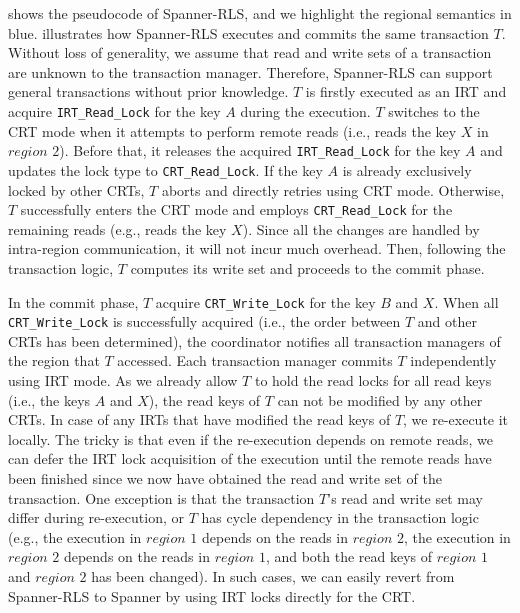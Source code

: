  shows the pseudocode of Spanner-RLS, and we highlight the regional semantics in blue.  illustrates how Spanner-RLS executes and commits the same transaction $T$. Without loss of generality, we assume that read and write sets of a transaction are unknown to the transaction manager. Therefore, Spanner-RLS can support general transactions without prior knowledge. $T$ is firstly executed as an IRT and acquire \texttt{IRT\_Read\_Lock} for the key $A$ during the execution. $T$ switches to the CRT mode when it attempts to perform remote reads (i.e., reads the key $X$ in $region$ $2$). Before that, it releases the acquired \texttt{IRT\_Read\_Lock} for the key $A$  and updates the lock type to \texttt{CRT\_Read\_Lock}. If the key $A$ is already exclusively locked by other CRTs, $T$ aborts and directly retries using CRT mode. Otherwise, $T$ successfully enters the CRT mode and employs \texttt{CRT\_Read\_Lock} for the remaining reads (e.g., reads the key $X$).
Since all the changes are handled by intra-region communication, it will not incur much overhead. Then, following the transaction logic, $T$ computes its write set and proceeds to the commit phase. 



In the commit phase, $T$ acquire \texttt{CRT\_Write\_Lock} for the key $B$ and $X$. When all \texttt{CRT\_Write\_Lock} is successfully acquired (i.e., the order between $T$ and other CRTs has been determined), the coordinator notifies all transaction managers of the region that $T$ accessed. Each transaction manager commits $T$ independently using IRT mode. As we already allow $T$ to hold the read locks for all read keys (i.e., the keys $A$ and $X$), the read keys of $T$ can not be modified by any other CRTs. In case of any IRTs that have modified the read keys of $T$, we re-execute it locally. The tricky is that even if the re-execution depends on remote reads, we can defer the IRT lock acquisition of the execution until the remote reads have been finished since we now have obtained the read and write set of the transaction. One exception is that the transaction $T$'s read and write set may differ during re-execution, or $T$ has cycle dependency in the transaction logic (e.g., the execution in $region$ $1$ depends on the reads in $region$ $2$, the execution in $region$ $2$ depends on the reads in $region$ $1$, and both the read keys of $region$ $1$ and $region$ $2$ has been changed). In such cases, we can easily revert from Spanner-RLS to Spanner by using IRT locks directly for the CRT.

